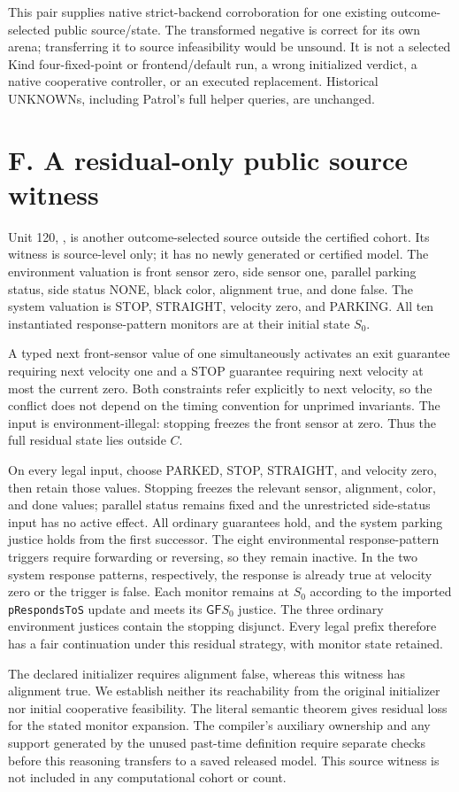 This pair supplies native strict-backend corroboration for one existing
outcome-selected public source/state. The transformed negative is correct
for its own arena; transferring it to source infeasibility would be
unsound. It is not a selected Kind four-fixed-point or frontend/default
run, a wrong initialized verdict, a native cooperative controller, or
an executed replacement. Historical UNKNOWNs, including Patrol's full
helper queries, are unchanged.

\section*{F. A residual-only public source witness}
Unit 120, , is another
outcome-selected source outside the certified cohort. Its witness is
source-level only; it has no newly generated or certified model.
The environment valuation is front sensor zero, side sensor one,
parallel parking status, side status NONE, black color, alignment true,
and done false. The system valuation is STOP, STRAIGHT, velocity zero,
and PARKING. All ten instantiated response-pattern monitors are at
their initial state $S_0$.

A typed next front-sensor value of one simultaneously activates an
exit guarantee requiring next velocity one and a STOP guarantee
requiring next velocity at most the current zero. Both constraints
refer explicitly to next velocity, so the conflict does not depend
on the timing convention for unprimed invariants. The input is
environment-illegal: stopping freezes the front sensor at zero.
Thus the full residual state lies outside $C$.

On every legal input, choose PARKED, STOP, STRAIGHT, and velocity zero,
then retain those values. Stopping freezes the relevant sensor,
alignment, color, and done values; parallel status remains fixed and
the unrestricted side-status input has no active effect. All ordinary
guarantees hold, and the system parking justice holds from the first
successor. The eight environmental response-pattern triggers require
forwarding or reversing, so they remain inactive. In the two system
response patterns, respectively, the response is already true at
velocity zero or the trigger is false. Each monitor remains at $S_0$
according to the imported \texttt{pRespondsToS} update and meets its
$\mathsf{GF}S_0$ justice. The three ordinary environment justices
contain the stopping disjunct. Every legal prefix therefore has a
fair continuation under this residual strategy, with monitor state
retained.

The declared initializer requires alignment false, whereas this
witness has alignment true. We establish neither its reachability
from the original initializer nor initial cooperative feasibility.
The literal semantic theorem gives residual loss for the stated
monitor expansion. The compiler's auxiliary ownership and any support
generated by the unused past-time definition require separate checks
before this reasoning transfers to a saved released model. This
source witness is not included in any computational cohort or count.
